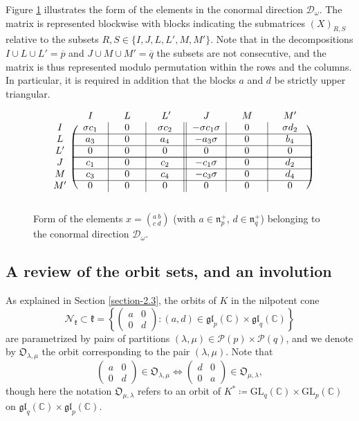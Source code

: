 \documentclass[ALCO,Unicode]{cedram}
\newcommand{\fk}{\mathfrak{k}}
\newcommand{\fn}{\mathfrak{n}}
\newcommand{\gl}{\mathfrak{gl}}
\newcommand{\subm}[2]{(#1)_{#2}}
\newcommand{\Nkorbit}{\mathfrak{O}}
\newcommand{\nilpotentsof}[1]{\mathcal{N}_{#1}}
\newcommand{\condir}{\mathcal{D}}
\newcommand{\intp}{\overline{p}}
\newcommand{\intq}{\overline{q}}
\newcommand{\partitionsof}[1]{\mathcal{P}(#1)}
\newcommand{\GL}{\mathrm{GL}}
\newcommand{\mC}{\mathbb{C}}
\begin{document}
Figure \ref{figure4} illustrates the form of the elements in the conormal direction $\mathcal{D}_\omega$. The matrix is represented blockwise with blocks indicating the submatrices $\subm{X}{R,S}$ relative to the subsets
$R,S\in\{I,J,L,L',M,M'\}$. Note that in the decompositions $I\cup L\cup L'=\intp$ and $J\cup M\cup M'=\intq$ the subsets are not consecutive,
and the matrix is thus represented modulo permutation within the rows and the columns. In particular, it is required in addition that the blocks $a$ and $d$ be strictly upper triangular.
\begin{figure}[h]
\[
\begin{blockarray}{ccccccc}
{} & {\quad I\quad} & {\quad L\quad} & {\quad L'\quad} & {\quad J\quad} & {\quad M\quad} & {\quad M'\quad}\\
\begin{block}{c(c|c|c||c|c|c)}
I & \sigma c_1 & 0 & \sigma c_2 & -\sigma c_1\sigma & 0 & \sigma d_2\\
\cline{2-7}
L & a_3 & 0 & a_4 & -a_3\sigma & 0 & b_4\\
\cline{2-7}
L' & 0 & 0 & 0 & 0 & 0 & 0\\
\cline{2-7}\\[-12pt] \cline{2-7}
J & c_1 & 0 & c_2 & -c_1\sigma & 0 & d_2\\
\cline{2-7}
M & c_3 & 0 & c_4 & -c_3\sigma & 0 & d_4\\
\cline{2-7}
M' & 0 & 0 & 0 & 0 & 0 & 0\\
\end{block}
\end{blockarray}
\]
\caption{Form of the elements $x=\left({}^{a \ b}_{c \ d}\right)$ (with $a\in\fn_p^+$, $d\in\fn_q^+$) belonging to the conormal direction $\condir_\omega$.}
\label{figure4}
\end{figure}

\subsection{A review of the orbit sets, and an involution}
As explained in Section \ref{section-2.3}, the orbits of $K$ in the nilpotent cone
\[
\nilpotentsof{\fk}\subset\fk=\left\{\begin{pmatrix} a & 0\\ 0 & d \end{pmatrix}: (a,d)\in \gl_p(\mC)\times\gl_q(\mC)\right\}
\]
are parametrized by pairs of partitions $(\lambda,\mu)\in\partitionsof{p}\times\partitionsof{q}$, and we denote by $\Nkorbit_{\lambda,\mu}$ the orbit corresponding to the pair $(\lambda,\mu)$.
Note that
\begin{equation}
\label{4.5new}
\begin{pmatrix} a & 0\\ 0 & d\end{pmatrix}\in\Nkorbit_{\lambda,\mu}\Longleftrightarrow \begin{pmatrix} d & 0\\ 0 & a \end{pmatrix}\in\Nkorbit_{\mu,\lambda},
\end{equation}
though here the notation $\Nkorbit_{\mu,\lambda}$ refers to an orbit of $K^*\coloneqq \GL_q(\mC)\times\GL_p(\mC)$ on $\gl_q(\mC)\times\gl_p(\mC)$.
\end{document}

